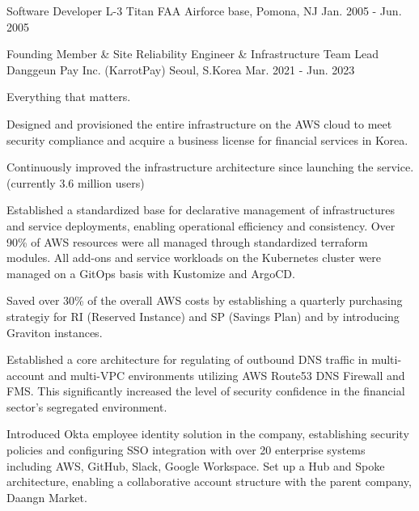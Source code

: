 \begin{cventries}
  \cventry
    {Software Developer} %
    {L-3 Titan} %
    {FAA Airforce base, Pomona, NJ} %
    {Jan. 2005 - Jun. 2005} %
    {
    }

  \cventry
    {Founding Member \& Site Reliability Engineer \& Infrastructure Team Lead} %
    {Danggeun Pay Inc. (KarrotPay)} %
    {Seoul, S.Korea} %
    {Mar. 2021 - Jun. 2023} %
    {
      \begin{cvitems} %
        \item {Everything that matters.}
        \item {Designed and provisioned the entire infrastructure on the AWS cloud to meet security compliance and acquire a business license for financial services in Korea.}
        \item {Continuously improved the infrastructure architecture since launching the service. (currently 3.6 million users)}
        \item {Established a standardized base for declarative management of infrastructures and service deployments, enabling operational efficiency and consistency. Over 90\% of AWS resources were all managed through standardized terraform modules. All add-ons and service workloads on the Kubernetes cluster were managed on a GitOps basis with Kustomize and ArgoCD.}
        \item {Saved over 30\% of the overall AWS costs by establishing a quarterly purchasing strategiy for RI (Reserved Instance) and SP (Savings Plan) and by introducing Graviton instances.}
        \item {Established a core architecture for regulating of outbound DNS traffic in multi-account and multi-VPC environments utilizing AWS Route53 DNS Firewall and FMS. This significantly increased the level of security confidence in the financial sector's segregated environment.}
        \item {Introduced Okta employee identity solution in the company, establishing security policies and configuring SSO integration with over 20 enterprise systems including AWS, GitHub, Slack, Google Workspace. Set up a Hub and Spoke architecture, enabling a collaborative account structure with the parent company, Daangn Market.}
      \end{cvitems}
    }


\end{cventries}
